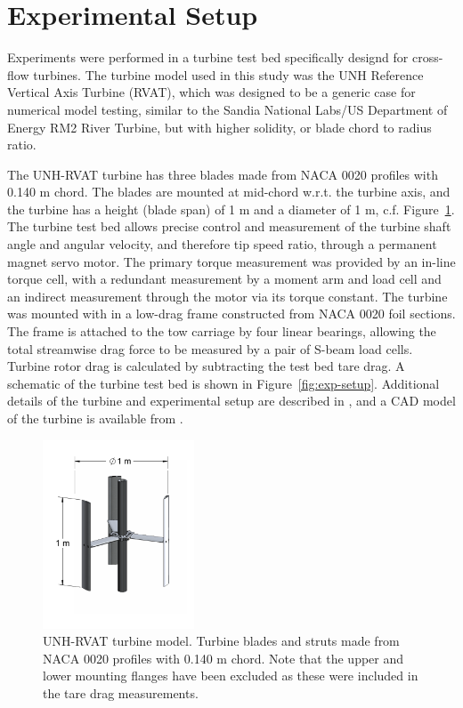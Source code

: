 \documentclass[energies,article,accept,moreauthors,pdftex,12pt,a4paper]{mdpi}
\begin{document}
\section{Experimental Setup}

Experiments were performed in a turbine test bed specifically designd for
cross-flow turbines. The turbine model used in this study was the UNH Reference
Vertical Axis Turbine (RVAT), which was designed to be a generic case for
numerical model testing, similar to the Sandia National Labs/US Department of
Energy RM2 River Turbine, but with higher solidity, or blade chord to radius
ratio.

The UNH-RVAT turbine has three blades made from NACA 0020 profiles with 0.140 m
chord. The blades are mounted at mid-chord w.r.t. the turbine axis, and the
turbine has a height (blade span) of 1 m and a diameter of 1 m, c.f.
Figure~\ref{fig:turbine}. The turbine test bed allows precise control and
measurement of the turbine shaft angle and angular velocity, and therefore tip
speed ratio, through a permanent magnet servo motor. The primary torque
measurement was provided by an in-line torque cell, with a redundant measurement
by a moment arm and load cell and an indirect measurement through the motor via
its torque constant. The turbine was mounted with in a low-drag frame
constructed from NACA 0020 foil sections.  The frame is attached to the tow
carriage by four linear bearings, allowing the total streamwise drag force to be
measured by a pair of S-beam load cells. Turbine rotor drag is calculated by
subtracting the test bed tare drag. A schematic of the turbine test bed is shown
in Figure~\ref{fig:exp-setup}. Additional details of the turbine and
experimental setup are described in \cite{Bachant2015-JoT}, and a CAD model of
the turbine is available from \cite{Bachant2014-RVAT-CAD}.



\begin{figure}[ht!]
\centering
\includegraphics[width=0.4\textwidth]{figures/turbine}
\caption{UNH-RVAT turbine model. Turbine blades and struts made from NACA 0020
profiles with 0.140 m chord. Note that the upper and lower mounting
flanges have been excluded as these were included in the tare drag
measurements.}
\label{fig:turbine}
\end{figure}
\end{document}
